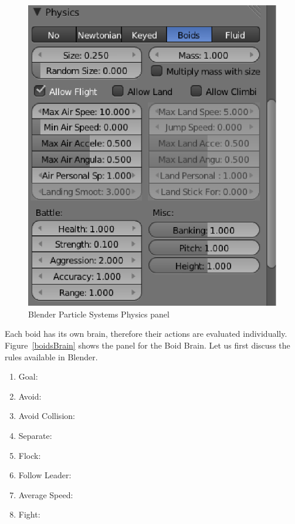 \begin{figure}[htbp]
\begin{center}
\includegraphics[scale = 0.5]{figures/boidsPhysics.eps} 
\caption{Blender Particle Systems Physics panel}
\label{boidsPhysics}
\end{center}
\end{figure}

Each boid has its own brain, therefore their actions are evaluated individually. Figure~\ref{boidsBrain} shows the panel for the Boid Brain. Let us first discuss the rules available in Blender.

\begin{enumerate}
\item{Goal: }
\item{Avoid: }
\item{Avoid Collision: }
\item{Separate: }
\item{Flock: }
\item{Follow Leader: }
\item{Average Speed: }
\item{Fight: }
\end{enumerate}

